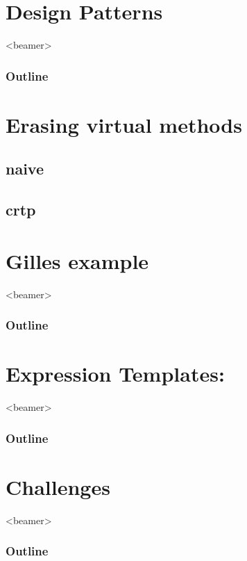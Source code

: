\documentclass[notes=hide,xcolor=svgnames,professionalfonts,lualatex]{beamer}
\begin{document}
\section{Design Patterns}
\begin{frame}<beamer>                                                                                                                    
    \frametitle{Outline}
    \tableofcontents[currentsection]
\end{frame}


\section{Erasing virtual methods}
\subsection{naive}

\subsection{crtp}


\section{Gilles example}
\begin{frame}<beamer>                                                                                                                    
    \frametitle{Outline}
    \tableofcontents[currentsection]
\end{frame}


\section{Expression Templates:}
\begin{frame}<beamer>                                                                                                                    
    \frametitle{Outline}
    \tableofcontents[currentsection]
\end{frame}


\section{Challenges}
\begin{frame}<beamer>
 \frametitle{Outline}
  \tableofcontents[currentsection]
\end{frame}
\end{document}
